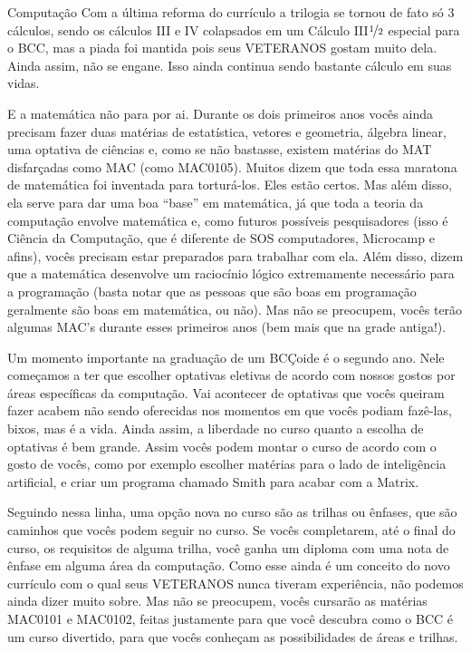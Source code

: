 \begin{subsecao}{Computação}
Com a última reforma do currículo a trilogia se tornou de fato só 3 cálculos,
sendo os cálculos III e IV colapsados em um Cálculo III$\nicefrac{1}{2}$
especial para o BCC, mas a piada foi mantida pois seus VETERANOS gostam muito
dela. Ainda assim, não se engane. Isso ainda continua sendo bastante cálculo em
suas vidas.

E a matemática não para por ai. Durante os dois primeiros anos vocês ainda
precisam fazer duas matérias de estatística, vetores e geometria, álgebra
linear, uma optativa de ciências e, como se não bastasse, existem matérias do
MAT disfarçadas como MAC (como MAC0105). Muitos dizem que toda essa maratona de
matemática foi inventada para torturá-los. Eles estão certos. Mas além disso,
ela serve para dar uma boa ``base'' em matemática, já que toda a teoria da
computação envolve matemática e, como futuros possíveis pesquisadores (isso é
Ciência da Computação, que é diferente de SOS computadores, Microcamp e afins),
vocês precisam estar preparados para trabalhar com ela. Além disso, dizem que a
matemática desenvolve um raciocínio lógico extremamente necessário para a
programação (basta notar que as pessoas que são boas em programação geralmente
são boas em matemática, ou não). Mas não se preocupem, vocês terão algumas MAC's
durante esses primeiros anos (bem mais que na grade antiga!).

Um momento importante na graduação de um BCÇoide é o segundo ano. Nele começamos
a ter que escolher optativas eletivas de acordo com nossos gostos por áreas
específicas da computação. Vai acontecer de optativas que vocês queiram fazer
acabem não sendo oferecidas nos momentos em que vocês podiam fazê-las, bixos,
mas é a vida. Ainda assim, a liberdade no curso quanto a escolha de optativas é
bem grande. Assim vocês podem montar o curso de acordo com o gosto de vocês,
como por exemplo escolher matérias para o lado de inteligência artificial, e
criar um programa chamado Smith para acabar com a Matrix.

Seguindo nessa linha, uma opção nova no curso são as trilhas ou ênfases, que
são caminhos que vocês podem seguir no curso. Se vocês completarem, até o final
do curso, os requisitos de alguma trilha, você ganha um diploma com uma nota de
ênfase em alguma área da computação. Como esse ainda é um conceito do novo
currículo com o qual seus VETERANOS nunca tiveram experiência, não podemos
ainda dizer muito sobre. Mas não se preocupem, vocês cursarão as matérias
MAC0101 e MAC0102, feitas justamente para que você descubra como o BCC é um
curso divertido, para que vocês conheçam as possibilidades de áreas e trilhas.


\end{subsecao}
